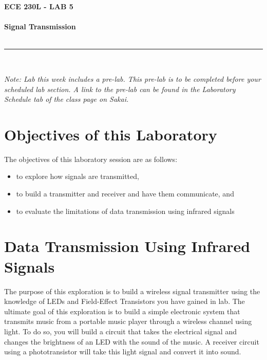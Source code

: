 \documentclass[12pt]{../manual}
\begin{document}
\begin{center}
\textbf{\huge ECE 230L - LAB 5}\\~\\
\textbf{\large Signal Transmission}\\~\\
\rule{6.5in}{0.5mm}\\
\end{center}

\textit{Note: Lab this week includes a pre-lab. This pre-lab is to be completed before your scheduled lab section. A link to the pre-lab can be found in the Laboratory Schedule tab of the class page on Sakai.}

\tableofcontents

\listoffigures
%
\newpage
\section{Objectives of this Laboratory}
The objectives of this laboratory session are as follows:
\begin{itemize}
\item to explore how signals are transmitted,
\item to build a transmitter and receiver and have them communicate, and
\item to evaluate the limitations of data transmission using infrared signals
\end{itemize}

\section{Data Transmission Using Infrared Signals}
The purpose of this exploration is to build a wireless signal transmitter using the knowledge of LEDs and Field-Effect Transistors you have gained in lab. The ultimate goal of this exploration is to build a simple electronic system that transmits music from a portable music player through a wireless channel using light. To do so, you will build a circuit that takes the electrical signal and changes the brightness of an LED with the sound of the music. A receiver circuit using a phototransistor will take this light signal and convert it into sound.
\end{document}

